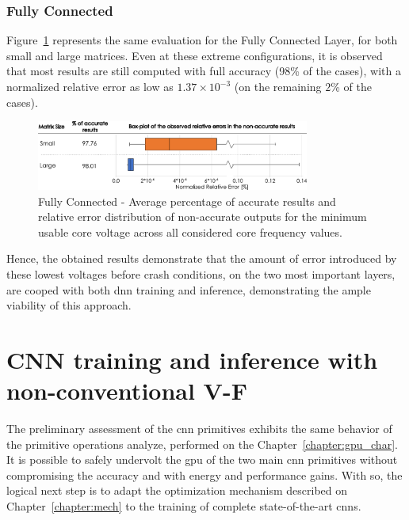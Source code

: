 \subsubsection{Fully Connected}

Figure~\ref{fig:MatrixMult_errors} represents the same evaluation for the Fully Connected Layer, for both small and large matrices. Even at these extreme configurations, it is observed that most results are still computed with full accuracy (98\% of the cases), with a normalized relative error as low as $1.37\times10^{-3}$ (on the remaining $2$\% of the cases).

\begin{figure}[htbp]
    \centering
        \includegraphics[width=0.8\textwidth]{Figures/Application To Deep Learning/MatrixMul_Error_Distribution.pdf}
        \caption{Fully Connected - Average percentage of accurate results and relative error distribution of non-accurate outputs for the minimum usable core voltage across all considered core frequency values.}
    \label{fig:MatrixMult_errors}
\end{figure}

Hence, the obtained results demonstrate that the amount of error introduced by these lowest voltages before crash conditions, on the two most important layers, are cooped with both \acrshort{dnn} training and inference, demonstrating the ample viability of this approach.


\section{CNN training and inference with non-conventional V-F}
\label{section:enhanced}

The preliminary assessment of the \acrshort{cnn} primitives exhibits the same behavior of the primitive operations analyze, performed on the Chapter~\ref{chapter:gpu_char}. It is possible to safely undervolt the \acrshort{gpu} of the two main \acrshort{cnn} primitives without compromising the accuracy and with energy and performance gains. With so, the logical next step is to adapt the optimization mechanism described on Chapter~\ref{chapter:mech} to the training of complete state-of-the-art \acrshort{cnn}s.


